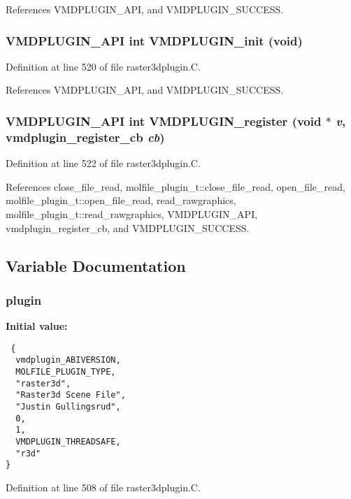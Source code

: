 References VMDPLUGIN\_\-API, and VMDPLUGIN\_\-SUCCESS.
\subsubsection{\setlength{\rightskip}{0pt plus 5cm}VMDPLUGIN\_\-API int VMDPLUGIN\_\-init (void)}\label{raster3dplugin_8C_a6}




Definition at line 520 of file raster3dplugin.C.

References VMDPLUGIN\_\-API, and VMDPLUGIN\_\-SUCCESS.
\subsubsection{\setlength{\rightskip}{0pt plus 5cm}VMDPLUGIN\_\-API int VMDPLUGIN\_\-register (void $\ast$ {\em v}, {\bf vmdplugin\_\-register\_\-cb} {\em cb})}\label{raster3dplugin_8C_a8}




Definition at line 522 of file raster3dplugin.C.

References close\_\-file\_\-read, molfile\_\-plugin\_\-t::close\_\-file\_\-read, open\_\-file\_\-read, molfile\_\-plugin\_\-t::open\_\-file\_\-read, read\_\-rawgraphics, molfile\_\-plugin\_\-t::read\_\-rawgraphics, VMDPLUGIN\_\-API, vmdplugin\_\-register\_\-cb, and VMDPLUGIN\_\-SUCCESS.

\subsection{Variable Documentation}
\subsubsection{ plugin\hspace{0.3cm}{\tt  [static]}}\label{raster3dplugin_8C_a0}


{\bf Initial value:}

\footnotesize\begin{verbatim} {
  vmdplugin_ABIVERSION,  
  MOLFILE_PLUGIN_TYPE,   
  "raster3d",            
  "Raster3d Scene File", 
  "Justin Gullingsrud",  
  0,                     
  1,                     
  VMDPLUGIN_THREADSAFE,  
  "r3d"                  
}\end{verbatim}\normalsize 


Definition at line 508 of file raster3dplugin.C.